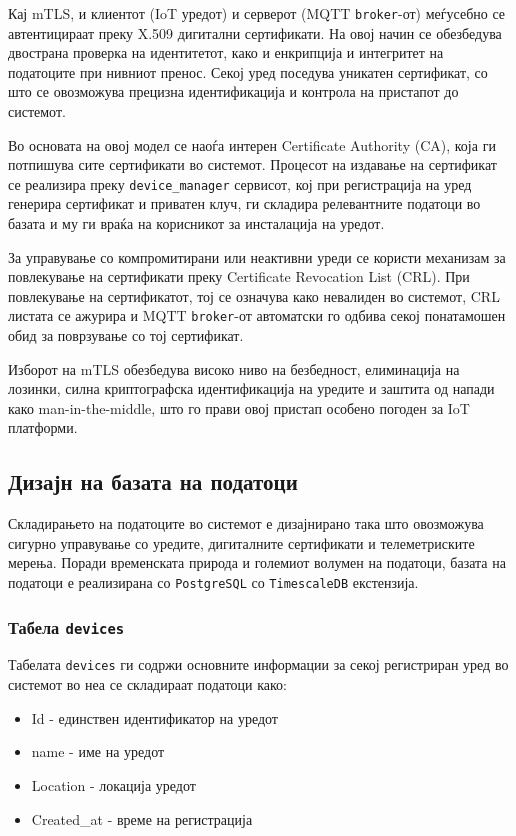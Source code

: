 Кај mTLS, и клиентот (IoT уредот) и серверот (MQTT \texttt{broker}-от) меѓусебно
се автентицираат преку X.509 дигитални сертификати. На овој начин се
обезбедува двострана проверка на идентитетот, како и енкрипција и
интегритет на податоците при нивниот пренос. Секој уред поседува
уникатен сертификат, со што се овозможува прецизна идентификација и
контрола на пристапот до системот.

Во основата на овој модел се наоѓа интерен Certificate Authority (CA),
која ги потпишува сите сертификати во системот. Процесот на издавање на
сертификат се реализира преку \texttt{device\_manager} сервисот, кој при
регистрација на уред генерира сертификат и приватен клуч, ги складира
релевантните податоци во базата и му ги враќа на корисникот за
инсталација на уредот.

За управување со компромитирани или неактивни уреди се користи механизам
за повлекување на сертификати преку Certificate Revocation List (CRL).
При повлекување на сертификатот, тој се означува како невалиден во
системот, CRL листата се ажурира и MQTT \texttt{broker}-от автоматски го одбива
секој понатамошен обид за поврзување со тој сертификат.

Изборот на mTLS обезбедува високо ниво на безбедност, елиминација на
лозинки, силна криптографска идентификација на уредите и заштита од
напади како man-in-the-middle, што го прави овој пристап особено погоден
за IoT платформи.

\subsection{Дизајн на базата на податоци}

Складирањето на податоците во системот е дизајнирано така што овозможува
сигурно управување со уредите, дигиталните сертификати и телеметриските
мерења. Поради временската природа и големиот волумен на податоци,
базата на податоци е реализирана со \texttt{PostgreSQL} со \texttt{TimescaleDB}
екстензија.

\subsubsection{Табела \texttt{devices}}

Табелата \texttt{devices} ги содржи основните информации за секој регистриран
уред во системот во неа се складираат податоци како:

\begin{itemize}
\item
  Id - единствен идентификатор на уредот
\item
  name - име на уредот
\item
  Location - локација уредот
\item
  Created\_at - време на регистрација
\end{itemize}

